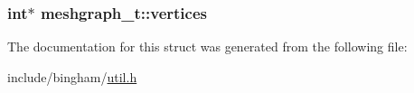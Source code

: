 \label{structmeshgraph__t_af65bff1e233044c3df4cf61fc3678dec}
\hypertarget{structmeshgraph__t_a1bea06e4f4be54551784cbfb2b0f7251}{
\subsubsection[{vertices}]{\setlength{\rightskip}{0pt plus 5cm}int$\ast$ {\bf meshgraph\_\-t::vertices}}}
\label{structmeshgraph__t_a1bea06e4f4be54551784cbfb2b0f7251}


The documentation for this struct was generated from the following file:\begin{DoxyCompactItemize}
\item 
include/bingham/\hyperlink{util_8h}{util.h}\end{DoxyCompactItemize}
